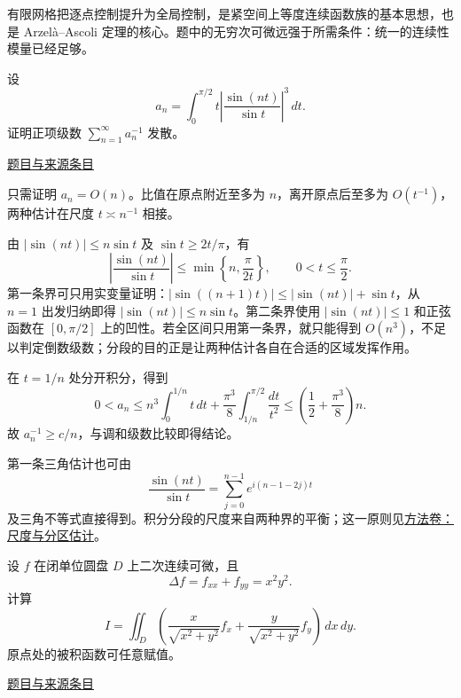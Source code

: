 \documentclass[UTF8,12pt,a4paper,fontset=fandol]{ctexart}
\begin{document}
\begin{remark}[方法与条件]有限网格把逐点控制提升为全局控制，是紧空间上等度连续函数族的基本思想，也是 Arzelà--Ascoli 定理的核心。题中的无穷次可微远强于所需条件：统一的连续性模量已经足够。\end{remark}

\begin{example}[来源序号5]\label{ex:pre01-math:5}\label{pr:pre01-math:5}

设
\[
a_n=\int_0^{\pi/2}t\left|\frac{\sin(nt)}{\sin t}\right|^3\,dt.
\]
证明正项级数 $\sum_{n=1}^\infty a_n^{-1}$ 发散。

\par\href{https://github.com/lzxcr/cmc-mathematics/blob/64916fa1fdbc3e444a652eca204d5669058ee321/src/problems/preliminary/01/05.md}{题目与来源条目}

\end{example}

\begin{solve}\label{ans:pre01-math:5}

只需证明 $a_n=O(n)$。比值在原点附近至多为 $n$，离开原点后至多为 $O(t^{-1})$，两种估计在尺度 $t\asymp n^{-1}$ 相接。

由 $|\sin(nt)|\le n\sin t$ 及 $\sin t\ge2t/\pi$，有
\[
\left|\frac{\sin(nt)}{\sin t}\right|
\le\min\left\{n,\frac{\pi}{2t}\right\},\qquad 0<t\le\frac\pi2.
\]
第一条界可只用实变量证明：$|\sin((n+1)t)|\le |\sin(nt)|+\sin t$，从 $n=1$ 出发归纳即得 $|\sin(nt)|\le n\sin t$。第二条界使用 $|\sin(nt)|\le1$ 和正弦函数在 $[0,\pi/2]$ 上的凹性。若全区间只用第一条界，就只能得到 $O(n^3)$，不足以判定倒数级数；分段的目的正是让两种估计各自在合适的区域发挥作用。

在 $t=1/n$ 处分开积分，得到
\[
0<a_n\le n^3\int_0^{1/n}t\,dt
+\frac{\pi^3}{8}\int_{1/n}^{\pi/2}\frac{dt}{t^2}
\le\left(\frac12+\frac{\pi^3}{8}\right)n.
\]
故 $a_n^{-1}\ge c/n$，与调和级数比较即得结论。

\end{solve}

\begin{remark}[方法与条件]第一条三角估计也可由
\[
\frac{\sin(nt)}{\sin t}
=\sum_{j=0}^{n-1}e^{i(n-1-2j)t}
\]
及三角不等式直接得到。积分分段的尺度来自两种界的平衡；这一原则见\hyperref[app:estimate-scaling]{方法卷：尺度与分区估计}。\end{remark}

\begin{example}[来源序号6]\label{ex:pre01-math:6}\label{pr:pre01-math:6}

设 $f$ 在闭单位圆盘 $D$ 上二次连续可微，且
\[
\Delta f=f_{xx}+f_{yy}=x^2y^2.
\]
计算
\[
I=\iint_D\left(
\frac{x}{\sqrt{x^2+y^2}}f_x+
\frac{y}{\sqrt{x^2+y^2}}f_y
\right)\,dx\,dy.
\]
原点处的被积函数可任意赋值。

\par\href{https://github.com/lzxcr/cmc-mathematics/blob/64916fa1fdbc3e444a652eca204d5669058ee321/src/problems/preliminary/01/06.md}{题目与来源条目}

\end{example}
\end{document}
